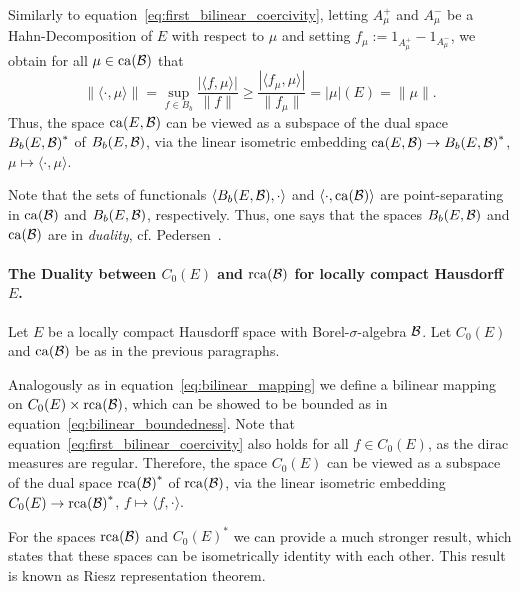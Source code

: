 \documentclass[../Master.tex]{subfiles}
\begin{document}
Similarly to equation~\eqref{eq:first_bilinear_coercivity}, letting \(A_\mu^+\) and \(A_\mu^-\) be a Hahn-Decomposition of \(E\) with respect to \(\mu{}\) and setting \(f_\mu := 1_{A_\mu^+} - 1_{A_\mu^-}\), we obtain for all \(\mu \in \mathrm{ca}(\mathcal{B})\) that
\begin{equation}\label{eq:second_bilinear_coercivity}
  \left\lVert \langle \cdot, \mu \rangle \right\rVert = \sup_{f \in B_b} \frac{\left\lvert \langle f, \mu \rangle \right\rvert}{\lVert f \rVert} \ge \frac{\left\lvert \langle f_\mu, \mu \rangle \right\rvert}{\lVert f_\mu \rVert} = \lvert \mu \rvert (E) = \lVert \mu \rVert.
\end{equation}
Thus, the space \(\mathrm{ca}(E,\mathcal{B})\) can be viewed as a subspace of the dual space \({B_b(E,\mathcal{B})}^{*}\) of \(B_b(E,\mathcal{B})\), via the linear isometric embedding \(\mathrm{ca}(E,\mathcal{B}) \to {B_b(E,\mathcal{B})}^{*}\), \(\mu \mapsto \langle \cdot, \mu \rangle{}\).

Note that the sets of functionals \(\langle B_b(E,\mathcal{B}), \cdot \rangle{}\) and \(\langle \cdot, \mathrm{ca}(\mathcal{B}) \rangle{}\) are point-separating in \(\mathrm{ca}(\mathcal{B})\) and \(B_b(E,\mathcal{B})\), respectively. Thus, one says that the spaces  \(B_b(E,\mathcal{B})\) and \(\mathrm{ca}(\mathcal{B})\) are in \emph{duality}, cf. Pedersen~\cite[Definition 2.3.8]{pedersen_analysis_1989}.

\paragraph{The Duality between \(C_0(E)\) and \(\mathrm{rca}(\mathcal{B})\) for locally compact Hausdorff \(E\).}
Let \(E\) be a locally compact Hausdorff space with Borel-\(\sigma{}\)-algebra \(\mathcal{B}\). Let \(C_0(E)\) and \(\mathrm{ca}(\mathcal{B})\) be as in the previous paragraphs.

Analogously as in equation~\eqref{eq:bilinear_mapping} we define a bilinear mapping on \(C_0(E) \times \mathrm{rca}(\mathcal{B})\), which can be showed to be bounded as in equation~\eqref{eq:bilinear_boundedness}. Note that equation~\eqref{eq:first_bilinear_coercivity} also holds for all \(f \in C_0(E)\), as the dirac measures are regular. Therefore, the space \(C_0(E)\) can be viewed as a subspace of the dual space \({\mathrm{rca}(\mathcal{B})}^{*}\) of \(\mathrm{rca}(\mathcal{B})\), via the linear isometric embedding \(C_0(E) \to {\mathrm{rca}(\mathcal{B})}^{*}\), \(f \mapsto \langle f, \cdot \rangle{}\).

For the spaces \(\mathrm{rca}(\mathcal{B})\) and \({C_0(E)}^*\) we can provide a much stronger result, which states that these spaces can be isometrically identity with each other. This result is known as Riesz representation theorem.
\end{document}
